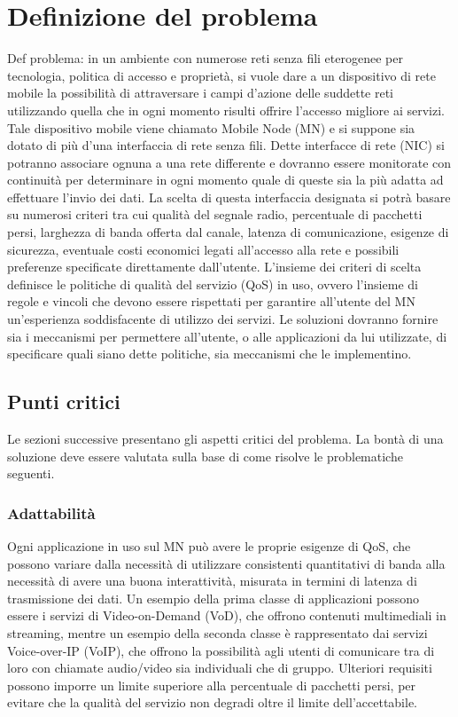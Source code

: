 \documentclass[12pt,a4paper,openright,twoside]{book}
\begin{document}
\chapter{Definizione del problema}
\lhead[\fancyplain{}{\bfseries\thepage}]{\fancyplain{}{\bfseries\rightmark}}
 Def problema: in un ambiente con numerose reti
senza fili eterogenee per tecnologia, politica di accesso e proprietà,
si vuole dare a un dispositivo di rete mobile la possibilità di
attraversare i campi d'azione delle suddette reti utilizzando quella
che in ogni momento risulti offrire l'accesso migliore ai
servizi. Tale dispositivo mobile viene chiamato Mobile Node (MN) e si
suppone sia dotato di più d'una interfaccia di rete senza fili. Dette
interfacce di rete (NIC) si potranno associare ognuna a una rete
differente e dovranno essere monitorate con continuità per determinare
in ogni momento quale di queste sia la più adatta ad effettuare
l'invio dei dati. La scelta di questa interfaccia designata si potrà
basare su numerosi criteri tra cui qualità del segnale radio,
percentuale di pacchetti persi, larghezza di banda offerta dal canale,
latenza di comunicazione, esigenze di sicurezza, eventuale costi
economici legati all'accesso alla rete e possibili preferenze
specificate direttamente dall'utente. L'insieme dei criteri di scelta
definisce le politiche di qualità del servizio (QoS) in uso, ovvero
l'insieme di regole e vincoli che devono essere rispettati per
garantire all'utente del MN un'esperienza soddisfacente di utilizzo
dei servizi. Le soluzioni dovranno fornire sia i meccanismi per
permettere all'utente, o alle applicazioni da lui utilizzate, di
specificare quali siano dette politiche, sia meccanismi che le
implementino.

\section{Punti critici}
\label{sec:punti-critici}
Le sezioni successive presentano gli aspetti critici del problema. La
bontà di una soluzione deve essere valutata sulla base di come risolve
le problematiche seguenti.

\subsection{Adattabilità}
Ogni applicazione in uso sul MN può avere le proprie esigenze di QoS,
che possono variare dalla necessità di utilizzare consistenti
quantitativi di banda alla necessità di avere una buona interattività,
misurata in termini di latenza di trasmissione dei dati. Un esempio
della prima classe di applicazioni possono essere i servizi di
Video-on-Demand (VoD), che offrono contenuti multimediali in
streaming, mentre un esempio della seconda classe è rappresentato dai
servizi Voice-over-IP (VoIP), che offrono la possibilità agli utenti
di comunicare tra di loro con chiamate audio/video sia individuali che
di gruppo. Ulteriori requisiti possono imporre un limite superiore
alla percentuale di pacchetti persi, per evitare che la qualità del
servizio non degradi oltre il limite dell'accettabile.
\end{document}
